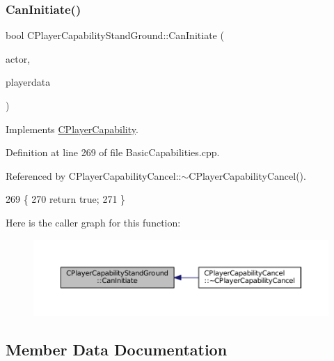 \subsubsection{\texorpdfstring{Can\+Initiate()}{CanInitiate()}}
{\footnotesize\ttfamily bool C\+Player\+Capability\+Stand\+Ground\+::\+Can\+Initiate (\begin{DoxyParamCaption}\item[{std\+::shared\+\_\+ptr$<$ \hyperlink{classCPlayerAsset}{C\+Player\+Asset} $>$}]{actor,  }\item[{std\+::shared\+\_\+ptr$<$ \hyperlink{classCPlayerData}{C\+Player\+Data} $>$}]{playerdata }\end{DoxyParamCaption})\hspace{0.3cm}{\ttfamily [virtual]}}



Implements \hyperlink{classCPlayerCapability_aa83b1e1fcaff2985c378132d679154ea}{C\+Player\+Capability}.



Definition at line 269 of file Basic\+Capabilities.\+cpp.



Referenced by C\+Player\+Capability\+Cancel\+::$\sim$\+C\+Player\+Capability\+Cancel().


\begin{DoxyCode}
269                                                                                                            
                     \{
270     \textcolor{keywordflow}{return} \textcolor{keyword}{true};
271 \}
\end{DoxyCode}
Here is the caller graph for this function\+:\nopagebreak
\begin{figure}[H]
\begin{center}
\leavevmode
\includegraphics[width=350pt]{classCPlayerCapabilityStandGround_a5567bfa47166f4080bd2b86f5c33e29c_icgraph}
\end{center}
\end{figure}


\subsection{Member Data Documentation}
\hypertarget{classCPlayerCapabilityStandGround_a7e89ffa413cea60b2f3c923fe5f44201}{}\label{classCPlayerCapabilityStandGround_a7e89ffa413cea60b2f3c923fe5f44201} 
